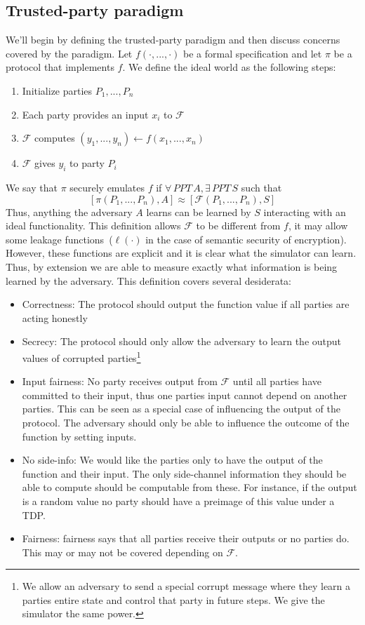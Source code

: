 \documentclass{article}
\begin{document}
\subsection{Trusted-party paradigm}
We'll begin by defining the trusted-party paradigm and then discuss concerns covered by the paradigm.  Let $f(\cdot, ..., \cdot)$ be a formal specification and let $\pi$ be a protocol that implements $f$.  We define the ideal world as the following steps:
\begin{enumerate}
\item Initialize parties $P_1,..., P_n$
\item Each party provides an input $x_i$ to $\mathcal{F}$
\item $\mathcal{F}$ computes $(y_1,..., y_n)\leftarrow f(x_1,..., x_n)$
\item $\mathcal{F}$ gives $y_i$ to party $P_i$
\end{enumerate}
We say that $\pi$ securely emulates $f$ if $\forall \, PPT\, A, \exists \, PPT\, S$ such that 
\[
[\pi(P_1, ..., P_n), A]\approx [\mathcal{F}(P_1,..., P_n), S]
\]
Thus, anything the adversary $A$ learns can be learned by $S$ interacting with an ideal functionality.  This definition allows $\mathcal{F}$ to be different from $f$, it may allow some leakage functions~($\ell(\cdot)$ in the case of semantic security of encryption).  However, these functions are explicit and it is clear what the simulator can learn.  Thus, by extension we are able to measure exactly what information is being learned by the adversary.  This definition covers several desiderata:
\begin{itemize}
\item Correctness: The protocol should output the function value if all parties are acting honestly
\item Secrecy: The protocol should only allow the adversary to learn the output values of corrupted parties\footnote{We allow an adversary to send a special corrupt message where they learn a parties entire state and control that party in future steps.  We give the simulator the same power.}
\item Input fairness: No party receives output from $\mathcal{F}$ until all parties have committed to their input, thus one parties input cannot depend on another parties.  This can be seen as a special case of influencing the output of the protocol.  The adversary should only be able to influence the outcome of the function by setting inputs.
\item No side-info: We would like the parties only to have the output of the function and their input.  The only side-channel information they should be able to compute should be computable from these.  For instance, if the output is a random value no party should have a preimage of this value under a TDP.
\item Fairness: fairness says that all parties receive their outputs or no parties do.  This may or may not be covered depending on $\mathcal{F}$.  
\end{itemize}
\end{document}

